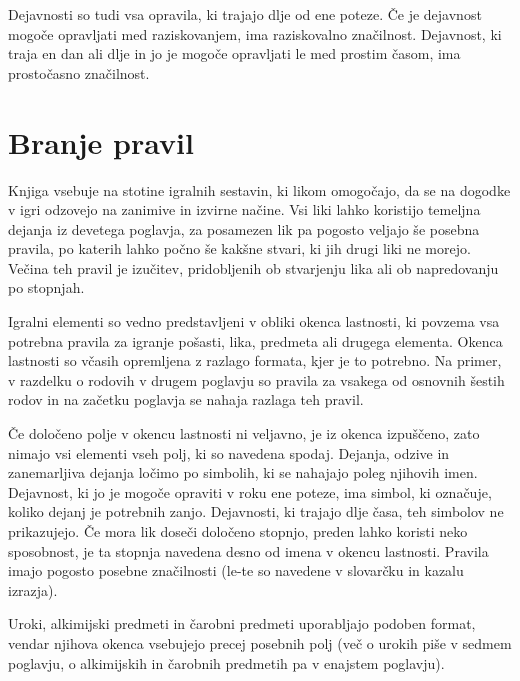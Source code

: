Dejavnosti so tudi vsa opravila, ki trajajo dlje od ene poteze. Če je dejavnost mogoče opravljati med raziskovanjem, ima raziskovalno značilnost. Dejavnost, ki traja en dan ali dlje in jo je mogoče opravljati le med prostim časom, ima prostočasno značilnost.

\section{Branje pravil}
Knjiga vsebuje na stotine igralnih sestavin, ki likom omogočajo, da se na dogodke v igri odzovejo na zanimive in izvirne načine. Vsi liki lahko koristijo temeljna dejanja iz devetega poglavja, za posamezen lik pa pogosto veljajo še posebna pravila, po katerih lahko počno še kakšne stvari, ki jih drugi liki ne morejo. Večina teh pravil je izučitev, pridobljenih ob stvarjenju lika ali ob napredovanju po stopnjah.

Igralni elementi so vedno predstavljeni v obliki okenca lastnosti, ki povzema vsa potrebna pravila za igranje pošasti, lika, predmeta ali drugega elementa. Okenca lastnosti so včasih opremljena z razlago formata, kjer je to potrebno. Na primer, v razdelku o rodovih v drugem poglavju so pravila za vsakega od osnovnih šestih rodov in na začetku poglavja se nahaja razlaga teh pravil.

Če določeno polje v okencu lastnosti ni veljavno, je iz okenca izpuščeno, zato nimajo vsi elementi vseh polj, ki so navedena spodaj. Dejanja, odzive in zanemarljiva dejanja ločimo po simbolih, ki se nahajajo poleg njihovih imen. Dejavnost, ki jo je mogoče opraviti v roku ene poteze, ima simbol, ki označuje, koliko dejanj je potrebnih zanjo. Dejavnosti, ki trajajo dlje časa, teh simbolov ne prikazujejo. Če mora lik doseči določeno stopnjo, preden lahko koristi neko sposobnost, je ta stopnja navedena desno od imena v okencu lastnosti. Pravila imajo pogosto posebne značilnosti (le-te so navedene v slovarčku in kazalu izrazja).

Uroki, alkimijski predmeti in čarobni predmeti uporabljajo podoben format, vendar njihova okenca vsebujejo precej posebnih polj (več o urokih piše v sedmem poglavju, o alkimijskih in čarobnih predmetih pa v enajstem poglavju).
